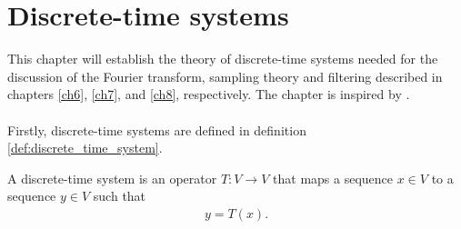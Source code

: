 \chapter{Discrete-time systems}\label{discrete_time_systems} \label{ch4}
This chapter will establish the theory of discrete-time systems needed for the discussion of the Fourier transform, sampling theory and filtering described in chapters \ref{ch6}, \ref{ch7}, and \ref{ch8}, respectively. The chapter is inspired by \cite{page 195-, FSP}.
\\ \\
Firstly, discrete-time systems are defined in definition \ref{def:discrete_time_system}.

\begin{definition}\label{def:discrete_time_system}
A discrete-time system is an operator $T: V \to V$ that maps a sequence $x\in V$ to a sequence $y\in V$ such that
\begin{align}
y=T(x).
\end{align}
\end{definition}

